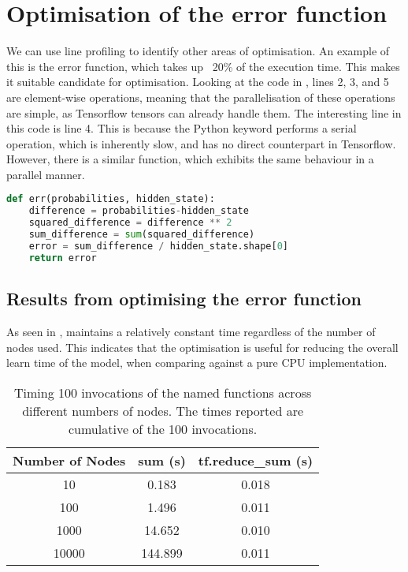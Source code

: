 \section{Optimisation of the error function}
We can use line profiling to identify other areas of optimisation.
An example of this is the error function, which takes up ~20\% of the execution time. 
This makes it suitable candidate for optimisation.
Looking at the code in , lines 2, 3, and 5 are element-wise operations, meaning that the parallelisation of these operations are simple, as Tensorflow tensors can already handle them.
The interesting line in this code is line 4.
This is because the Python keyword  performs a serial operation, which is inherently slow, and has no direct counterpart in Tensorflow.
However, there is a similar function,  which exhibits the same behaviour in a parallel manner.
\begin{minipage}{\linewidth}
\begin{lstlisting}[caption=Error function split into each operation, label=code:errorfunc,language=python]
def err(probabilities, hidden_state):
    difference = probabilities-hidden_state
    squared_difference = difference ** 2
    sum_difference = sum(squared_difference)
    error = sum_difference / hidden_state.shape[0]
    return error
\end{lstlisting}
\end{minipage}

\subsection{Results from optimising the error function}
\label{subsec:res_sum}


As seen in ,  maintains a relatively constant time regardless of the number of nodes used. 
This indicates that the optimisation is useful for reducing the overall learn time of the model, when comparing against a pure CPU implementation.

\begin{table}[ht]
    \centering
    \begin{tabular}{|c|c|c|}
        \hline
        Number of Nodes & sum (s)   & tf.reduce\_sum (s)\\ \hline
        10              & 0.183     & 0.018             \\ \hline
        100             & 1.496     & 0.011             \\ \hline
        1000            & 14.652    & 0.010             \\ \hline
        10000           & 144.899   & 0.011             \\ \hline
    \end{tabular}
    \caption{ Timing 100 invocations of the named functions across different numbers of nodes. The times reported are cumulative of the 100 invocations. }
    \label{tab:sum_v_reduce}
\end{table}

